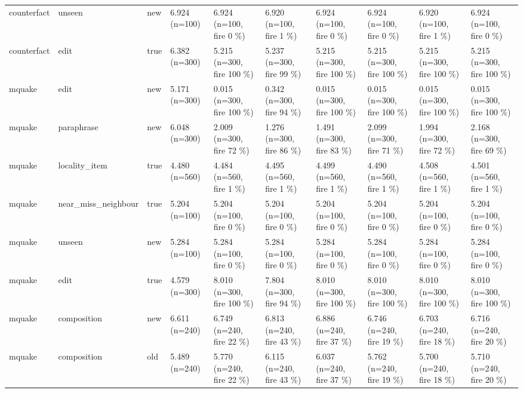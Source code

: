 \documentclass[10pt,a4paper]{article}
\begin{document}
\begin{center}
\begin{tabularx}{\textwidth}{@{}p{}XXXXXXXXX@{}}
counterfact & unseen & new & 6.924 (n=100) & 6.924 (n=100, fire 0 \%) & 6.920 (n=100, fire 1 \%) & 6.924 (n=100, fire 0 \%) & 6.924 (n=100, fire 0 \%) & 6.920 (n=100, fire 1 \%) & 6.924 (n=100, fire 0 \%) \\
counterfact & edit & true & 6.382 (n=300) & 5.215 (n=300, fire 100 \%) & 5.237 (n=300, fire 99 \%) & 5.215 (n=300, fire 100 \%) & 5.215 (n=300, fire 100 \%) & 5.215 (n=300, fire 100 \%) & 5.215 (n=300, fire 100 \%) \\
mquake & edit & new & 5.171 (n=300) & 0.015 (n=300, fire 100 \%) & 0.342 (n=300, fire 94 \%) & 0.015 (n=300, fire 100 \%) & 0.015 (n=300, fire 100 \%) & 0.015 (n=300, fire 100 \%) & 0.015 (n=300, fire 100 \%) \\
mquake & paraphrase & new & 6.048 (n=300) & 2.009 (n=300, fire 72 \%) & 1.276 (n=300, fire 86 \%) & 1.491 (n=300, fire 83 \%) & 2.099 (n=300, fire 71 \%) & 1.994 (n=300, fire 72 \%) & 2.168 (n=300, fire 69 \%) \\
mquake & locality\_item & true & 4.480 (n=560) & 4.484 (n=560, fire 1 \%) & 4.495 (n=560, fire 1 \%) & 4.499 (n=560, fire 1 \%) & 4.490 (n=560, fire 1 \%) & 4.508 (n=560, fire 1 \%) & 4.501 (n=560, fire 1 \%) \\
mquake & near\_miss\_neighbour & true & 5.204 (n=100) & 5.204 (n=100, fire 0 \%) & 5.204 (n=100, fire 0 \%) & 5.204 (n=100, fire 0 \%) & 5.204 (n=100, fire 0 \%) & 5.204 (n=100, fire 0 \%) & 5.204 (n=100, fire 0 \%) \\
mquake & unseen & new & 5.284 (n=100) & 5.284 (n=100, fire 0 \%) & 5.284 (n=100, fire 0 \%) & 5.284 (n=100, fire 0 \%) & 5.284 (n=100, fire 0 \%) & 5.284 (n=100, fire 0 \%) & 5.284 (n=100, fire 0 \%) \\
mquake & edit & true & 4.579 (n=300) & 8.010 (n=300, fire 100 \%) & 7.804 (n=300, fire 94 \%) & 8.010 (n=300, fire 100 \%) & 8.010 (n=300, fire 100 \%) & 8.010 (n=300, fire 100 \%) & 8.010 (n=300, fire 100 \%) \\
mquake & composition & new & 6.611 (n=240) & 6.749 (n=240, fire 22 \%) & 6.813 (n=240, fire 43 \%) & 6.886 (n=240, fire 37 \%) & 6.746 (n=240, fire 19 \%) & 6.703 (n=240, fire 18 \%) & 6.716 (n=240, fire 20 \%) \\
mquake & composition & old & 5.489 (n=240) & 5.770 (n=240, fire 22 \%) & 6.115 (n=240, fire 43 \%) & 6.037 (n=240, fire 37 \%) & 5.762 (n=240, fire 19 \%) & 5.700 (n=240, fire 18 \%) & 5.710 (n=240, fire 20 \%) \\
\bottomrule
\end{tabularx}
\end{center}
\end{document}
